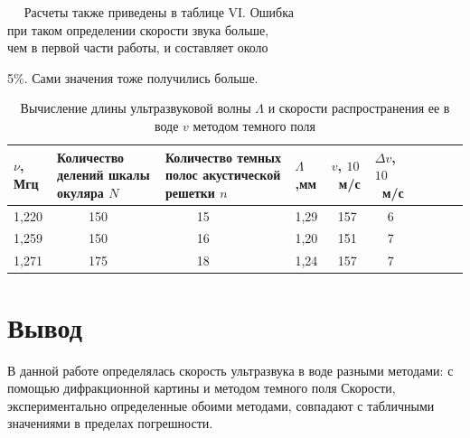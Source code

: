 \documentclass[journal, a4paper]{IEEEtran}
\begin{document}
\,\,\,\,\,\,\,\,Расчеты также приведены в таблице VI. Ошибка\\ \hspace*{17pt} при таком определении скорости звука больше, \\ \hspace*{21pt}чем в первой части работы, и
составляет около 

\hspace*{12pt}5\%. Сами значения тоже получились больше.\\[0.3cm]

\begin{table}[h!]
	\centering
\begin{tabular}{|p{0.7cm}|p{2cm}|p{2cm}|p{0.7cm}|p{0.83cm}|p{0.83cm}|c|c|c|c|}
\hline
 \vspace{0.22cm} \hspace{5pt}$\nu$\hspace{2pt}, Мгц& Количество делений шкалы окуляра $N$&Количество темных полос акустической решетки $n$&\vspace{0.25cm} \hspace{2pt}$\Lambda$,мм&\vspace{0.25cm} \hspace{10pt}$v$, $10$~м/с&\vspace{0.21cm} \hspace{5pt}$\Delta v$, $10$~м/с\\
\hline
1,220&~~~~~150&~~~~~15&1,29&~157&~~6\\
\hline
1,259&~~~~~150&~~~~~16&1,20&~151&~~7\\
\hline
1,271&~~~~~175&~~~~~18&1,24&~157&~~7\\
\hline
\end{tabular}
	\caption{Вычисление длины ультразвуковой волны $ \Lambda $ и скорости распространения ее в воде $ v $ методом темного поля}
	\label{dark}
\end{table}
\section{Вывод}

В данной работе определялась скорость ультразвука в воде разными методами: с помощью дифракционной картины  и методом темного поля  Скорости, экспериментально определенные обоими методами,
совпадают с табличными значениями в пределах погрешности.



\end{document}
